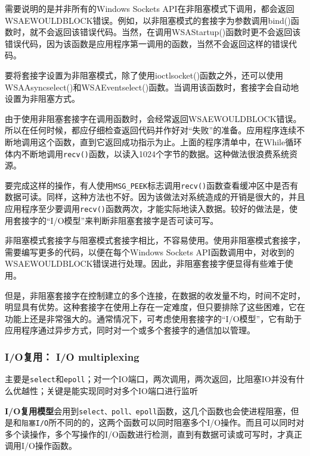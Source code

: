 \documentclass[UTF8,a4paper,12pt]{ctexbook}
\begin{document}
			需要说明的是并非所有的Windows Sockets API在非阻塞模式下调用，都会返回WSAEWOULDBLOCK错误。例如，以非阻塞模式的套接字为参数调用bind()函数时，就不会返回该错误代码。当然，在调用WSAStartup()函数时更不会返回该错误代码，因为该函数是应用程序第一调用的函数，当然不会返回这样的错误代码。
			
			要将套接字设置为非阻塞模式，除了使用ioctlsocket()函数之外，还可以使用WSAAsyncselect()和WSAEventselect()函数。当调用该函数时，套接字会自动地设置为非阻塞方式。
			
			
			由于使用非阻塞套接字在调用函数时，会经常返回WSAEWOULDBLOCK错误。所以在任何时候，都应仔细检查返回代码并作好对“失败”的准备。应用程序连续不断地调用这个函数，直到它返回成功指示为止。上面的程序清单中，在While循环体内不断地调用\verb|recv()|函数，以读入1024个字节的数据。这种做法很浪费系统资源。
			
			要完成这样的操作，有人使用\verb|MSG_PEEK|标志调用\verb|recv()|函数查看缓冲区中是否有数据可读。同样，这种方法也不好。因为该做法对系统造成的开销是很大的，并且应用程序至少要调用\verb|recv()|函数两次，才能实际地读入数据。较好的做法是，使用套接字的“I/O模型”来判断非阻塞套接字是否可读可写。
			
			非阻塞模式套接字与阻塞模式套接字相比，不容易使用。使用非阻塞模式套接字，需要编写更多的代码，以便在每个Windows Sockets API函数调用中，对收到的WSAEWOULDBLOCK错误进行处理。因此，非阻塞套接字便显得有些难于使用。
			
			但是，非阻塞套接字在控制建立的多个连接，在数据的收发量不均，时间不定时，明显具有优势。这种套接字在使用上存在一定难度，但只要排除了这些困难，它在功能上还是非常强大的。通常情况下，可考虑使用套接字的“I/O模型”，它有助于应用程序通过异步方式，同时对一个或多个套接字的通信加以管理。
			
			\subsubsection{I/O复用： I/O multiplexing}
			主要是\verb|select|和\verb|epoll|；对一个IO端口，两次调用，两次返回，比阻塞IO并没有什么优越性；关键是能实现同时对多个IO端口进行监听
			
			\textbf{I/O复用模型}会用到\verb|select、poll、epoll|函数，这几个函数也会使进程阻塞，但是和\verb|阻塞I/O|所不同的的，这两个函数可以同时阻塞多个I/O操作。而且可以同时对多个读操作，多个写操作的I/O函数进行检测，直到有数据可读或可写时，才真正调用I/O操作函数。
			
\end{document}
